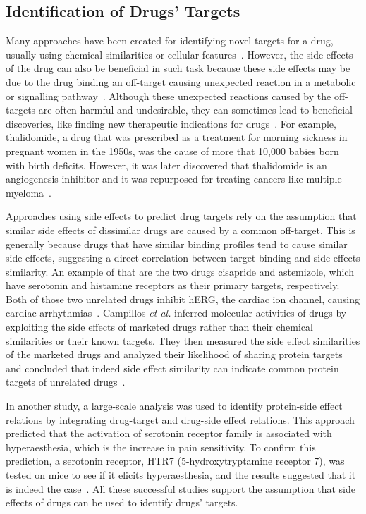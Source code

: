 \subsection{Identification of Drugs' Targets}

Many approaches have been created for identifying novel targets for a drug, usually using chemical similarities or cellular features~\cite{campillos_drug_2008}.
However, the side effects of the drug can also be beneficial in such task because these side effects may be due to the drug binding an off-target causing unexpected reaction in a metabolic or signalling pathway~\cite{lotfi_shahreza_review_2018}.
Although these unexpected reactions caused by the off-targets are often harmful and undesirable, they can sometimes lead to beneficial discoveries, like finding new therapeutic indications for drugs~\cite{campillos_drug_2008}.
For example, thalidomide, a drug that was prescribed as a treatment for morning sickness in pregnant women in the 1950s, was the cause of more that 10,000 babies born with birth deficits.
However, it was later discovered that thalidomide is an angiogenesis inhibitor and it was repurposed for treating cancers like multiple myeloma~\cite{vargesson_thalidomideinduced_2015}.

Approaches using side effects to predict drug targets rely on the assumption that similar side effects of dissimilar drugs are caused by a common off-target.
This is generally because drugs that have similar binding profiles tend to cause similar side effects, suggesting a direct correlation between target binding and side effects similarity.
An example of that are the two drugs cisapride and astemizole, which have serotonin and histamine receptors as their primary targets, respectively.
Both of those two unrelated drugs inhibit hERG, the cardiac ion channel, causing cardiac arrhythmias~\cite{campillos_drug_2008}.
Campillos \textit{et al.} inferred molecular activities of drugs by exploiting the side effects of marketed drugs rather than their chemical similarities or their known targets.
They then measured the side effect similarities of the marketed drugs and analyzed their likelihood of sharing protein targets and concluded that indeed side effect similarity can indicate common protein targets of unrelated drugs~\cite{campillos_drug_2008}.

In another study, a large-scale analysis was used to identify protein-side effect relations by integrating drug-target and drug-side effect relations.
This approach predicted that the activation of serotonin receptor family is associated with hyperaesthesia, which is the increase in pain sensitivity.
To confirm this prediction, a serotonin receptor, HTR7 (5-hydroxytryptamine receptor 7), was tested on mice to see if it elicits hyperaesthesia, and the results suggested that it is indeed the case~\cite{kuhn_systematic_2014}.
All these successful studies support the assumption that side effects of drugs can be used to identify drugs' targets.

